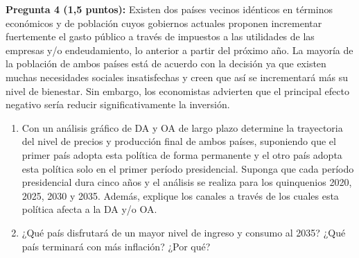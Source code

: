 \documentclass[11pt,addpoints]{article}
\begin{document}
\vspace{0.3cm}

\textbf{Pregunta 4 (1,5 puntos):}
Existen dos países vecinos idénticos en términos económicos y de población cuyos gobiernos actuales proponen incrementar fuertemente el gasto público a través de impuestos a las utilidades de las empresas y/o endeudamiento, lo anterior a partir del próximo año. La mayoría de la población de ambos países está de acuerdo con la decisión ya que existen muchas necesidades sociales insatisfechas y creen que así se incrementará más su nivel de bienestar. Sin embargo, los economistas advierten que el principal efecto negativo sería reducir significativamente la inversión.  

\begin{enumerate}[label=\alph*)]
    \item Con un análisis gráfico de DA y OA de largo plazo determine la trayectoria del nivel de precios y producción final de ambos países, suponiendo que el primer país adopta esta política de forma permanente y el otro país adopta esta política solo en el primer período presidencial. Suponga que cada período presidencial dura cinco años y el análisis se realiza para los quinquenios 2020, 2025, 2030 y 2035. Además, explique los canales a través de los cuales esta política afecta a la DA y/o OA.  
    \item ¿Qué país disfrutará de un mayor nivel de ingreso y consumo al 2035? ¿Qué país terminará con más inflación? ¿Por qué?  
\end{enumerate}
\end{document}
